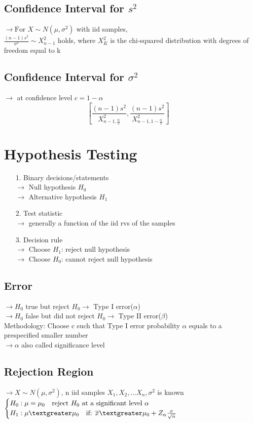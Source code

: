\documentclass{article}
\begin{document}
\subsection{Confidence Interval for $s^2$}
$\rightarrow \text{For }X\sim N(\mu, \sigma^2)$ with iid samples,\\
$\frac{(n-1)s^2}{\sigma^2}\sim X_{n-1}^2$ holds, where $X_K^2$ is the chi-squared distribution with degrees of freedom equal to k
\subsection{Confidence Interval for $\sigma^2$}
$\rightarrow$ at confidence level $c=1-\alpha$\\
\[[\frac{(n-1)s^2}{X_{n-1,\frac{\alpha}{2}}^2},\frac{(n-1)s^2}{X_{n-1,1- \frac{\alpha}{2}}^2}]\]
\newpage
\section{Hypothesis Testing}
\begin{itemize}
    \item [1.] Binary decisions/statements\\
    $\rightarrow$ Null hypothesis $H_0$\\
    $\rightarrow$ Alternative hypothesis $H_1$
    \item[2.] Test statistic\\
    $\rightarrow$ generally a function of the iid rvs of the samples
    \item[3.] Decision rule\\
    $\rightarrow$ Choose $H_1$: reject null hypothesis\\
    $\rightarrow$ Choose $H_0$: cannot reject null hypothesis
\end{itemize}
\subsection{Error}
$\rightarrow H_0$ true but reject $H_0 \rightarrow$ Type I error($\alpha$)\\
$\rightarrow H_0$ false but did not reject $H_0 \rightarrow$ Type II error($\beta$)\\
Methodology: Choose c such that Type I error probability $\alpha$ equals to a prespecified smaller number\\
$\rightarrow \alpha$ also called significance level
\subsection{Rejection Region}
$\rightarrow X\sim N(\mu, \sigma^2)$, n iid samples $X_1,X_2,...X_n, \sigma^2$ is known\\
$\begin{cases}
    H_0:\mu = \mu_0 \quad \text{reject }H_0\text{ at a significant level }\alpha\\
    H_1: \mu \textgreater \mu_0 \quad \text{if: } \overline{x} \textgreater \mu_0 + Z_{\alpha} \frac{\sigma}{\sqrt{n}}
\end{cases}$
\end{document}
